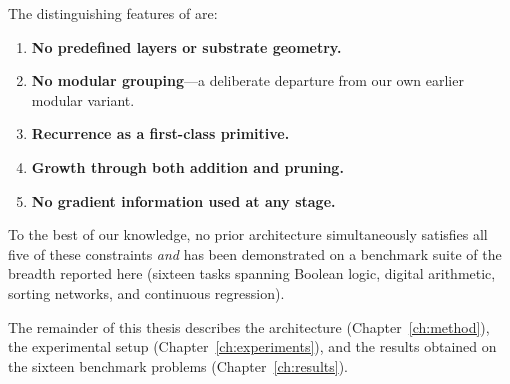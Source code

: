 The distinguishing features of \modnet{} are:

\begin{enumerate}
  \item \textbf{No predefined layers or substrate geometry.}
  \item \textbf{No modular grouping}---a deliberate departure from our
    own earlier modular variant.
  \item \textbf{Recurrence as a first-class primitive.}
  \item \textbf{Growth through both addition and pruning.}
  \item \textbf{No gradient information used at any stage.}
\end{enumerate}

To the best of our knowledge, no prior architecture simultaneously
satisfies all five of these constraints \emph{and} has been
demonstrated on a benchmark suite of the breadth reported here
(sixteen tasks spanning Boolean logic, digital arithmetic, sorting
networks, and continuous regression).

The remainder of this thesis describes the \modnet{} architecture
(Chapter~\ref{ch:method}), the experimental setup
(Chapter~\ref{ch:experiments}), and the results obtained on the sixteen
benchmark problems (Chapter~\ref{ch:results}).

